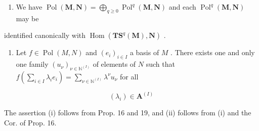 \begin{enumerate}
\def\labelenumi{(\roman{enumi})}
\tightlist
\item
  We have \(\operatorname{Pol}(\mathbf{M},\mathbf{N}) = \bigoplus_{q\geqslant 0}\operatorname{Pol}^q (\mathbf{M},\mathbf{N})\) and each \(\operatorname{Pol}^q (\mathbf{M},\mathbf{N})\) may be
\end{enumerate}

identified canonically with \(\operatorname{Hom}(\mathbf{TS}^q(\mathbf{M}),\mathbf{N})\) .

\begin{enumerate}
\def\labelenumi{(\roman{enumi})}
\setcounter{enumi}{1}
\tightlist
\item
  Let \(f \in \operatorname{Pol}(M, N)\) and \((e_i)_{i \in I}\) a basis of \(M\) . There exists one and only one family \((u_\nu)_{\nu \in \mathbb{N}^{(I)}}\) of elements of \(N\) such that \(f\left(\sum_{i \in I} \lambda_i e_i\right) = \sum_{\nu \in \mathbb{N}^{(I)}} \lambda^\nu u_\nu\) for all
\end{enumerate}

\[
\left(\lambda_ {i}\right) \in \mathbf {A} ^ {(I)}
\]

The assertion (i) follows from Prop. 16 and 19, and (ii) follows from (i) and the Cor. of Prop. 16.
\relax{}
